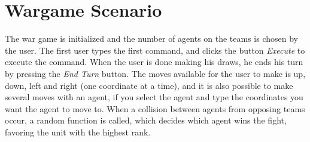 \section{Wargame Scenario}

The war game is initialized and the number of agents on the teams is chosen by the user. The first user types the first command, and clicks the button \textit{Execute} to execute the command. When the user is done making his draws, he ends his turn by pressing the \textit{End Turn} button.
   The moves available for the user to make is up, down, left and right (one coordinate at a time), and it is also possible to make several moves with an agent, if you select the agent and type the coordinates you want the agent to move to.
   When a collision between agents from opposing teams occur, a random function is called, which decides which agent wins the fight, favoring the unit with the highest rank.